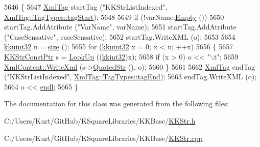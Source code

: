 \begin{DoxyCode}
5646 \{
5647   \hyperlink{class_k_k_b_1_1_xml_tag}{XmlTag}  startTag (\textcolor{stringliteral}{"KKStrListIndexed"}, \hyperlink{class_k_k_b_1_1_xml_tag_a6c0ef0e23f982f49d55d4fb7eaff6ac9ab02b23b5e15b3a1353771313e1176ce0}{XmlTag::TagTypes::tagStart});
5648 
5649   \textcolor{keywordflow}{if}  (!varName.\hyperlink{class_k_k_b_1_1_k_k_str_ac69942f73fffd672ec2a6e1c410afdb6}{Empty} ())
5650     startTag.AddAtribute (\textcolor{stringliteral}{"VarName"}, varName);
5651   startTag.AddAtribute (\textcolor{stringliteral}{"CaseSensative"}, caseSensative);
5652   startTag.WriteXML (o);
5653 
5654   \hyperlink{namespace_k_k_b_af8d832f05c54994a1cce25bd5743e19a}{kkuint32} n = \hyperlink{class_k_k_b_1_1_k_k_str_list_indexed_acd0f65c79018c6a0a0cb512222412e17}{size} ();
5655   \textcolor{keywordflow}{for}  (\hyperlink{namespace_k_k_b_af8d832f05c54994a1cce25bd5743e19a}{kkuint32} x = 0;  x < n;  ++x)
5656   \{
5657     \hyperlink{class_k_k_b_1_1_k_k_str}{KKStrConstPtr} s = \hyperlink{class_k_k_b_1_1_k_k_str_list_indexed_acde2ff3f2e16f9274fec0c09dd51b162}{LookUp} ((\hyperlink{namespace_k_k_b_a8fa4952cc84fda1de4bec1fbdd8d5b1b}{kkint32})x);
5658     \textcolor{keywordflow}{if}  (x > 0)  o << \textcolor{stringliteral}{"\(\backslash\)t"};
5659     \hyperlink{class_k_k_b_1_1_xml_content_ab0e370562d215b8e19dac6d18c4a95e1}{XmlContent::WriteXml} (s->\hyperlink{class_k_k_b_1_1_k_k_str_a193b549c8d4b41a9692f890dae1993f4}{QuotedStr} (), o);
5660   \}
5661 
5662   \hyperlink{class_k_k_b_1_1_xml_tag}{XmlTag} endTag (\textcolor{stringliteral}{"KKStrListIndexed"}, \hyperlink{class_k_k_b_1_1_xml_tag_a6c0ef0e23f982f49d55d4fb7eaff6ac9a3ceaa9a790f688ec97a35b5a3fd3b164}{XmlTag::TagTypes::tagEnd});
5663   endTag.WriteXML (o);
5664   o << \hyperlink{namespace_k_k_b_ad1f50f65af6adc8fa9e6f62d007818a8}{endl};
5665 \}
\end{DoxyCode}


The documentation for this class was generated from the following files\+:\begin{DoxyCompactItemize}
\item 
C\+:/\+Users/\+Kurt/\+Git\+Hub/\+K\+Square\+Libraries/\+K\+K\+Base/\hyperlink{_k_k_str_8h}{K\+K\+Str.\+h}\item 
C\+:/\+Users/\+Kurt/\+Git\+Hub/\+K\+Square\+Libraries/\+K\+K\+Base/\hyperlink{_k_k_str_8cpp}{K\+K\+Str.\+cpp}\end{DoxyCompactItemize}
